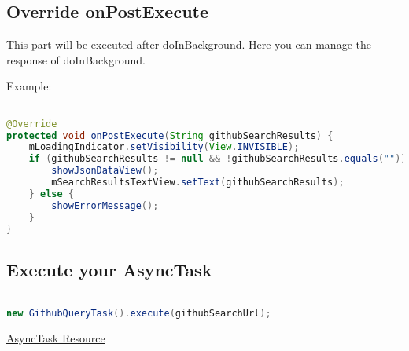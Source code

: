 \documentclass[12pt]{article} %
\begin{document}
\subsection{Override onPostExecute}
This part will be executed after doInBackground. Here you can manage the response of doInBackground. 

Example:

\begin{lstlisting}[language=Java]

@Override
protected void onPostExecute(String githubSearchResults) {
	mLoadingIndicator.setVisibility(View.INVISIBLE);
	if (githubSearchResults != null && !githubSearchResults.equals("")) {
		showJsonDataView();
		mSearchResultsTextView.setText(githubSearchResults);
	} else {
		showErrorMessage();
	}
}

\end{lstlisting}

\subsection{Execute your AsyncTask}

\begin{lstlisting}[language=Java]

new GithubQueryTask().execute(githubSearchUrl);

\end{lstlisting}


\href{https://developer.android.com/reference/android/os/AsyncTask.html}{AsyncTask Resource}
\end{document}
